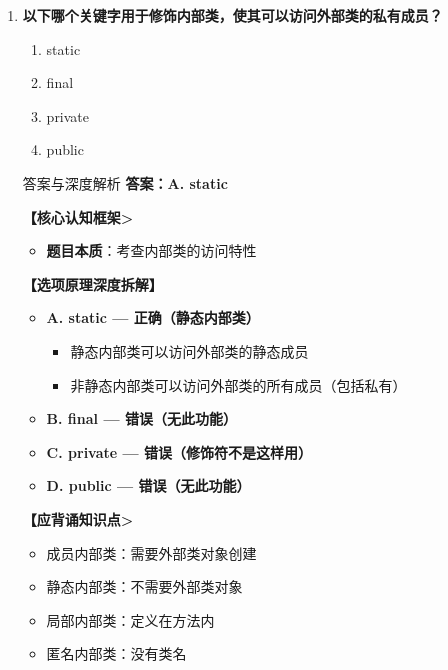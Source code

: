 \documentclass[12pt, a4paper]{ctexart}
\begin{document}
\begin{enumerate}[label=\textbf{\arabic*.}]
	      \vspace{1em}

	\item \textbf{以下哪个关键字用于修饰内部类，使其可以访问外部类的私有成员？}
	      \begin{enumerate}[label=\Alph*.]
		      \item static
		      \item final
		      \item private
		      \item public
	      \end{enumerate}

	      \begin{bluebox}{答案与深度解析}
		      \textbf{答案：A. static}

		      \textbf{【核心认知框架>}
		      \begin{itemize}[leftmargin=*, nosep, label={}]
			      \item \textbf{题目本质}：考查内部类的访问特性
		      \end{itemize}

		      \textbf{【选项原理深度拆解】}
		      \begin{itemize}[label={}, nosep]
			      \item \textbf{A. static — 正确（静态内部类）}
			      \begin{itemize}[label={}, nosep]
				      \item 静态内部类可以访问外部类的静态成员
				      \item 非静态内部类可以访问外部类的所有成员（包括私有）
			      \end{itemize}
			      \item \textbf{B. final — 错误（无此功能）}
			      \item \textbf{C. private — 错误（修饰符不是这样用）}
			      \item \textbf{D. public — 错误（无此功能）}
		      \end{itemize}

		      \textbf{【应背诵知识点>}
		      \begin{itemize}[label={}, nosep]
			      \item 成员内部类：需要外部类对象创建
			      \item 静态内部类：不需要外部类对象
			      \item 局部内部类：定义在方法内
			      \item 匿名内部类：没有类名
		      \end{itemize}
	      \end{bluebox}


\end{enumerate}
\end{document}
